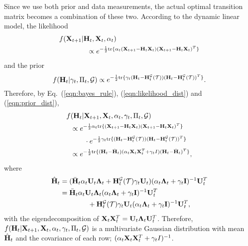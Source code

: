 \documentclass[journal]{IEEEtran}
\begin{document}
Since we use both prior and data measurements, the actual optimal transition matrix becomes a combination of these two.
According to the dynamic linear model, the likelihood
\begin{equation}\label{eqn:likelihood_dist}
\begin{aligned}
&f({\bf{X}}_{t+1}|{\bf{H}}_t,{\bf{X}}_t,\alpha_t)
\\&\qquad\qquad\propto e^{-\frac{1}{2}\text{tr}\{\alpha_t({\bf{X}}_{t+1}-{\bf{H}}_t{\bf{X}}_t)({\bf{X}}_{t+1}-{\bf{H}}_t{\bf{X}}_t)^T\}}
\end{aligned}
\end{equation}
and the prior
\begin{equation}\label{eqn:prior_dist}
f({\bf{H}}_t|\gamma_t,\Pi_t,\mathcal{G})\propto e^{-\frac{1}{2}\text{tr}\{\gamma_t({\bf{H}}_t-{\bf{H}}_t^{\mathcal{G}}(\mathcal{T}))({\bf{H}}_t-{\bf{H}}_t^{\mathcal{G}}(\mathcal{T}))^T\}}.
\end{equation}
Therefore, by Eq.~(\ref{eqn:bayes_rule}), (\ref{eqn:likelihood_dist}) and (\ref{eqn:prior_dist}),
\begin{equation}
\begin{aligned} f&({\bf{H}}_t|{\bf{X}}_{t+1},{\bf{X}}_t,\alpha_t,\gamma_t,\Pi_t,\mathcal{G})\\
&\propto e^{-\frac{1}{2}\alpha_t\text{tr}\{({\bf{X}}_{t+1}-{\bf{H}}_t{\bf{X}}_t)({\bf{X}}_{t+1}-{\bf{H}}_t{\bf{X}}_t)^T\}}\\
&\qquad\cdot e^{-\frac{1}{2}\gamma_t\text{tr}\{({\bf{H}}_t-{\bf{H}}_t^{\mathcal{G}}(\mathcal{T}))({\bf{H}}_t-{\bf{H}}_t^{\mathcal{G}}(\mathcal{T}))^T\}}\\
&\propto e^{-\frac{1}{2}\text{tr}\{({\bf{H}}_t-\hat {\bf{H}}_t)(\alpha_t{\bf{X}}_t{\bf{X}}_t^T+\gamma_tI)({\bf{H}}_t-\hat {\bf{H}}_t)^T\}},
\end{aligned}
\end{equation}
where 
\begin{equation}\label{eqn:probable_H}
    \begin{aligned}
    \hat{\bf{H}}_t&=({\bar{\bf{H}}}_t\alpha_t{\bf{U}}_t{\bf{\Lambda}}_t+{{\bf{H}}_t^{\mathcal{G}}(\mathcal{T})}\gamma_t{\bf{U}}_t)(\alpha_t{\bf{\Lambda}}_t+\gamma_t{\bf{I}})^{-1}{\bf{U}}_t^T\\
&=\bar{\bf{H}}_t\alpha_t{\bf{U}}_t{\bf{\Lambda}}_t(\alpha_t{\bf{\Lambda}}_t+\gamma_t{\bf{I}})^{-1}{\bf{U}}_t^T\\
&\qquad\qquad+{\bf{H}}_t^\mathcal{G}(\mathcal{T})\gamma_t{\bf{U}}_t(\alpha_t{\bf{\Lambda}}_t+\gamma_t{\bf{I}})^{-1}{\bf{U}}_t^T,
    \end{aligned}
\end{equation}
with the eigendecomposition of ${\bf{X}}_t{\bf{X}}_t^T={\bf{U}}_t{\bf{\Lambda}}_t{\bf{U}}_t^T$. 
Therefore, $f({\bf{H}}_t|{\bf{X}}_{t+1},{\bf{X}}_t,\alpha_t,\gamma_t,\Pi_t,\mathcal{G})$ is a multivariate Gaussian distribution with mean $\hat {\bf{H}}_t$ and the covariance of each row; $(\alpha_t{\bf{X}}_t{\bf{X}}_t^T+\gamma_tI)^{-1}$.
\end{document}
